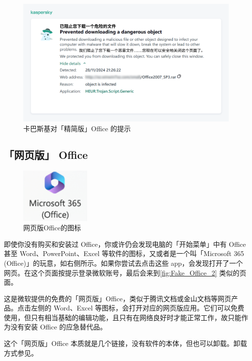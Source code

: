 \begin{figure}[htb!]
  \centering
  \includegraphics[width=.7\textwidth]{assets/software/Kaspersky_blocks_pirate_Office.pdf}
  \caption{卡巴斯基对「精简版」Office 的提示}
  \label{fig:Kaspersky_blocks_pirate_Office}
\end{figure}

\subsection{「网页版」 Office}

\begin{figure}
  \centering
  \vspace*{3ex}
  \includegraphics[width=3.5cm]{assets/software/Fake_Office.png}
  \caption{网页版Office的图标}
  \label{fig:Fake_Office}
\end{figure}

即使你没有购买和安装过 Office，你或许仍会发现电脑的「开始菜单」中有 Office 甚至 Word、PowerPoint、Excel 等软件的图标，又或者是一个叫「Microsoft 365 (Office)」的玩意，如右侧所示。如果你尝试去点击这些 app，会发现打开了一个网页。在这个页面按提示登录微软账号，最后会来到\autoref{fig:Fake_Office_2} 类似的页面。

这是微软提供的免费的「网页版」Office，类似于腾讯文档或金山文档等网页产品。点击左侧的 Word、Excel 等图标，会打开对应的网页版应用。它们可以免费使用，但只有相当基础的编辑功能，且只有在网络良好时才能正常工作，故只能作为没有安装 Office 的应急替代品。

这个「网页版」Office 本质就是几个链接，没有软件的本体，但也可以卸载。卸载方式参见。

